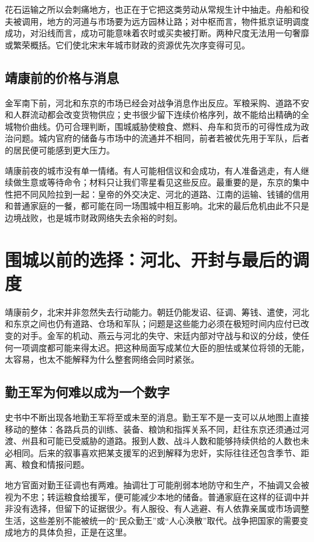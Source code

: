 花石运输之所以会刺痛地方，也正在于它把这类劳动从常规生计中抽走。舟船和役夫被调用，地方的河道与市场要为远方园林让路；对中枢而言，物件抵京证明调度成功，对沿线而言，成功可能意味着农时或买卖被打断。两种尺度无法用一句奢靡或繁荣概括。它们使北宋末年城市财政的资源优先次序变得可见。

\subsection{靖康前的价格与消息}

金军南下前，河北和东京的市场已经会对战争消息作出反应。军粮采购、道路不安和人群流动都会改变货物供应；史书很少留下连续价格序列，故不能给出精确的全城物价曲线。仍可合理判断，围城威胁使粮食、燃料、舟车和货币的可得性成为政治问题。城内官府的储备与市场中的流通并不相同，前者若被优先用于军队，后者的居民便可能感到更大压力。

靖康前夜的城市没有单一情绪。有人可能相信议和会成功，有人准备逃走，有人继续做生意或等待命令；材料只让我们零星看见这些反应。最重要的是，东京的集中性把不同风险拉到一起：皇帝的外交决定、河北的道路、江南的运输、钱铺的信用和普通家庭的一餐，都可能在同一场围城中相互影响。北宋的最后危机由此不只是边境战败，也是城市财政网络失去余裕的时刻。

\section{围城以前的选择：河北、开封与最后的调度}

靖康前夕，北宋并非忽然失去行动能力。朝廷仍能发诏、征调、筹钱、遣使，河北和东京之间也仍有道路、仓场和军队；问题是这些能力必须在极短时间内应付已改变的对手。金军的机动、燕云与河北的失守、宋廷内部对守战与和议的分歧，使任何一项调度都可能来得太迟。把这种局面写成某位大臣的胆怯或某位将领的无能，太容易，也太不能解释为什么整套网络会同时紧张。

\subsection{勤王军为何难以成为一个数字}

史书中不断出现各地勤王军将至或未至的消息。勤王军不是一支可以从地图上直接移动的整体：各路兵员的训练、装备、粮饷和指挥关系不同，赶往东京还须通过河渡、州县和可能已受威胁的道路。报到人数、战斗人数和能够持续供给的人数也未必相同。后来的叙事喜欢把某支援军的迟到解释为忠奸，实际往往还包含季节、距离、粮食和情报问题。

地方官面对勤王征调也有两难。抽调壮丁可能削弱本地防守和生产，不抽调又会被视为不忠；转运粮食给援军，便可能减少本地的储备。普通家庭在这样的征调中并非没有选择，但留下的证据很少。有人服役、有人逃避、有人依靠亲属或市场调整生活，这些差别不能被统一的“民众勤王”或“人心涣散”取代。战争把国家的需要变成地方的具体负担，正是在这里。

